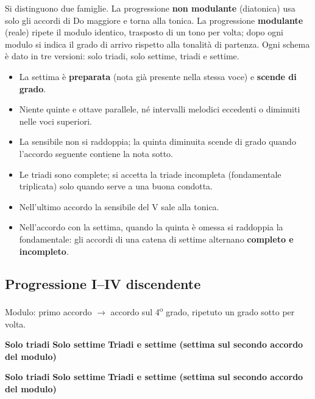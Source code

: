 Si distinguono due famiglie. La progressione \textbf{non modulante} (diatonica) usa solo gli accordi di Do maggiore e torna alla tonica. La progressione \textbf{modulante} (reale) ripete il modulo identico, trasposto di un tono per volta; dopo ogni modulo si indica il grado di arrivo rispetto alla tonalità di partenza. Ogni schema è dato in tre versioni: solo triadi, solo settime, triadi e settime.

\begin{regola}
	\label{reg:condotta_moduli}
	\begin{itemize}
		\item La settima è \textbf{preparata} (nota già presente nella stessa voce) e \textbf{scende di grado}.
		\item Niente quinte e ottave parallele, né intervalli melodici eccedenti o diminuiti nelle voci superiori.
		\item La sensibile non si raddoppia; la quinta diminuita scende di grado quando l'accordo seguente contiene la nota sotto.
		\item Le triadi sono complete; si accetta la triade incompleta (fondamentale triplicata) solo quando serve a una buona condotta.
		\item Nell'ultimo accordo la sensibile del V sale alla tonica.
		\item Nell'accordo con la settima, quando la quinta è omessa si raddoppia la fondamentale: gli accordi di una catena di settime alternano \textbf{completo e incompleto}.
	\end{itemize}
\end{regola}

\subsection{Progressione I–IV discendente}
\label{subsec:prog_i4d}
Modulo: primo accordo $\rightarrow$ accordo sul 4\textsuperscript{o} grado, ripetuto un grado sotto per volta.

\begin{esempio}
	\label{ex:prog_i4d_dia}
	\textbf{Solo triadi}
	\textbf{Solo settime}
	\textbf{Triadi e settime (settima sul secondo accordo del modulo)}
\end{esempio}

\begin{esempio}
	\label{ex:prog_i4d_rea}
	\textbf{Solo triadi}
	\textbf{Solo settime}
	\textbf{Triadi e settime (settima sul secondo accordo del modulo)}
\end{esempio}


